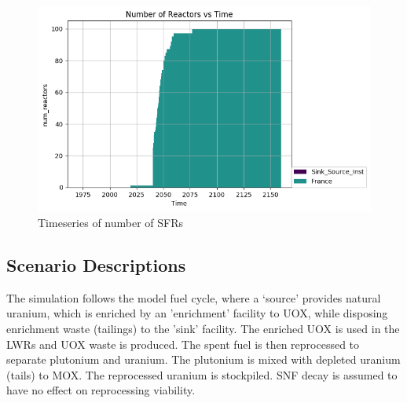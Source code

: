 \begin{figure}[htbp!]
	\begin{center}
		\includegraphics{./images/number_plot.png}
	\end{center}
	\caption{Timeseries of number of \gls{SFR}s}
	\label{fig:sfr_num}
\end{figure}



\subsection{Scenario Descriptions}
The simulation follows the model fuel cycle, where a `source'
provides natural uranium, which is enriched by an 'enrichment'
facility to \gls{UOX}, while disposing enrichment waste (tailings)
to the 'sink' facility. The enriched \gls{UOX} is used
in the \gls{LWR}s and \gls{UOX} waste is produced. The spent fuel
is then reprocessed to separate plutonium and uranium.
The plutonium is mixed with depleted uranium (tails) to \gls{MOX}.
The reprocessed uranium is stockpiled. \gls{SNF} decay is assumed
to have no effect on reprocessing viability.


